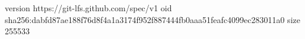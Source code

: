 version https://git-lfs.github.com/spec/v1
oid sha256:dabfd87ae188f76d8f4a1a3174f952f887444fb0aaa51feafc4099ec283011a0
size 255533

